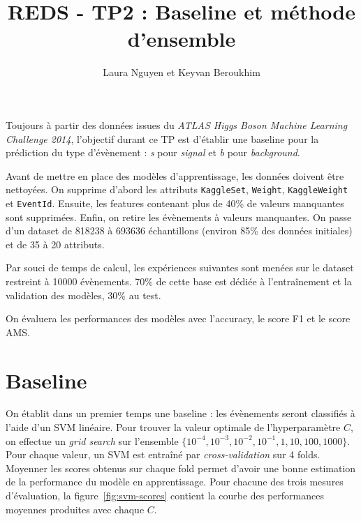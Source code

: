 \documentclass[12pt]{article}
\newcommand{\figref}[1]{figure~\ref{#1}}
\begin{document}
\title{REDS - TP2 : Baseline et méthode d'ensemble}
\author{Laura Nguyen et Keyvan Beroukhim}
\maketitle

Toujours à partir des données issues du \emph{ATLAS Higgs Boson Machine Learning
Challenge 2014}, l'objectif durant ce TP est d'établir une baseline pour la
prédiction du type d'évènement : \emph{s} pour \emph{signal} et \emph{b} pour
\emph{background}.

Avant de mettre en place des modèles d'apprentissage, les données doivent être
nettoyées. On supprime d'abord les attributs \texttt{KaggleSet},
\texttt{Weight}, \texttt{KaggleWeight} et \texttt{EventId}. Ensuite, les
features contenant plus de 40\% de valeurs manquantes sont supprimées. Enfin, on
retire les évènements à valeurs manquantes. On passe d'un dataset de 818238 à
693636 échantillons (environ 85\% des données initiales) et de 35 à 20
attributs.

Par souci de temps de calcul, les expériences suivantes sont menées sur le
dataset restreint à 10000 évènements. 70\% de cette base est dédiée à
l'entraînement et la validation des modèles, 30\% au test. 

On évaluera les performances des modèles avec l'accuracy, le score F1 et le
score AMS.

\section{Baseline}

On établit dans un premier temps une baseline : les évènements seront classifiés
à l'aide d'un SVM linéaire. Pour trouver la valeur optimale de l'hyperparamètre
$C$, on effectue un \emph{grid search} sur l'ensemble $\{10^{-4}, 10^{-3},
10^{-2}, 10^{-1}, 1, 10, 100, 1000\}$. Pour chaque valeur, un SVM est entraîné
par \emph{cross-validation} sur 4 folds. Moyenner les scores obtenus sur chaque
fold permet d'avoir une bonne estimation de la performance du modèle en
apprentissage. Pour chacune des trois mesures d'évaluation, la
\figref{fig:svm-scores} contient la courbe des performances moyennes produites
avec chaque $C$.
\end{document}
